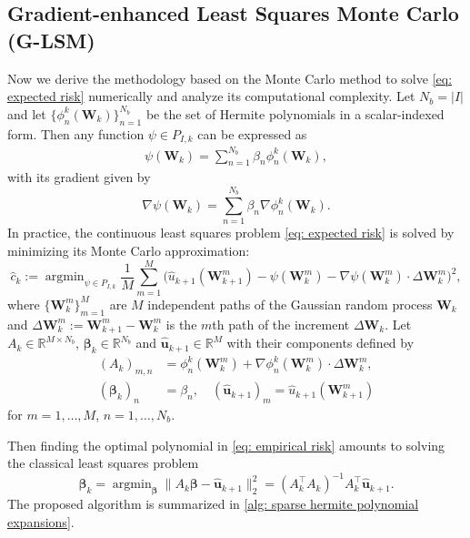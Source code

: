 \documentclass[10pt,a4paper]{amsart}
\numberwithin{equation}{section}
\numberwithin{algorithm}{section}
\theoremstyle{plain}
\theoremstyle{remark}
\DeclareMathOperator*{\argmin}{argmin}
\begin{document}
\subsection{Gradient-enhanced Least Squares Monte Carlo (G-LSM)} \label{subsec:glsm}
Now we derive the methodology based on the Monte Carlo method to solve \cref{eq: expected risk} numerically and analyze its computational complexity. Let $N_b=|I| $ and let $\{\phi_n^{k}(\mathbf{W}_k)\}_{n=1}^{N_b}$ be the set of Hermite polynomials in a scalar-indexed form. Then any function $\psi\in P_{I,k}$ can be expressed as
\begin{align*}
\psi(\mathbf{W}_k) = \sum_{n=1}^{N_b} \beta_n \phi_n^{k}(\mathbf{W}_k),
\end{align*}
with its gradient given by
\begin{equation} \label{eq: gradient of approx cv}
    \nabla \psi(\mathbf{W}_k) = \sum_{n=1}^{N_b} \beta_n \nabla \phi_n^{k}(\mathbf{W}_k).
\end{equation}
In practice, the continuous least squares problem \cref{eq: expected risk} is solved by minimizing its Monte Carlo approximation:
\begin{equation} \label{eq: empirical risk}
    \hat{c}_k := \argmin_{\psi \in P_{I,k}}
    \frac{1}{M}\sum_{m=1}^M
    \big(\hat{u}_{k+1}(\mathbf{W}^m_{k+1}) -
    \psi(\mathbf{W}^m_k) - \nabla \psi(\mathbf{W}^m_k) \cdot  \Delta\mathbf{W}^m_k
    \big)^2,
\end{equation}
where $\{\mathbf{W}^m_k\}_{m=1}^M$ are $M$ independent paths of the Gaussian random process $\mathbf{W}_k$ and $\Delta\mathbf{W}^m_k:=\mathbf{W}^m_{k+1} - \mathbf{W}^m_k$ is the $m$th path of the increment $\Delta \mathbf{W}_k$. Let $A_k\in\mathbb{R}^{M\times N_b}$, $\bm{\beta}_k\in\mathbb{R}^{ N_b}$ and $\mathbf{\hat{u}}_{k+1}\in\mathbb{R}^{ M}$ with their components defined by
\begin{equation} \label{eq:defi-linear-system}
    \begin{aligned}
        (A_k)_{m,n} &= \phi_n^{k}(\mathbf{W}^m_k) + \nabla \phi_n^{k}(\mathbf{W}^m_k) \cdot \Delta\mathbf{W}^m_k , \\
        (\bm{\beta}_k)_n &= \beta_n, \quad 
        (\mathbf{\hat{u}}_{k+1})_m = \hat{u}_{k+1}(\mathbf{W}^m_{k+1})
    \end{aligned}
\end{equation}
for $m = 1,\dots, M$, $n = 1,\dots, N_b$. 

Then finding the optimal polynomial in \cref{eq: empirical risk} amounts to solving the classical least squares problem
\begin{equation}\label{eq:ls-linearSystem}
    \bm{\beta}_k = \argmin_{\bm{\beta}} \|A_k \bm{\beta} - \mathbf{\hat{u}}_{k+1}\|_2^2 = (A_k^\top A_k)^{-1}A_k^\top \mathbf{\hat{u}}_{k+1}.
\end{equation}
The proposed algorithm is summarized in \cref{alg: sparse hermite polynomial expansions}.
\end{document}
